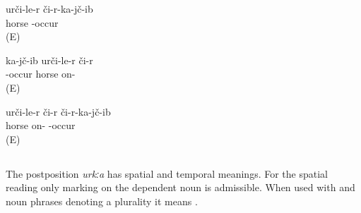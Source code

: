\begin{exe}
		\ex	\label{ex:He fell from the horse verbs_4}
	\gll	urči-le-r či-r-ka-jč-ib\\
		horse -occur\\
	\glt	{} (E)
	
	\ex	\label{ex:He fell from the horse verbs_2}
	\gll	ka-jč-ib urči-le-r	či-r \\
		-occur horse on-	\\
	\glt	{} (E)
	
		\ex	\label{ex:He fell from the horse verbs_3}
	\gll	urči-le-r či-r	či-r-ka-jč-ib\\
		horse on- -occur\\
	\glt	{} (E)
	
\end{exe}


\subsection{ }
\label{ssec:postposition urka}

The postposition \textit{urkːa} has spatial and temporal meanings. For the spatial reading only  marking on the dependent noun is admissible. When used with  and noun phrases denoting a plurality it means  . 


